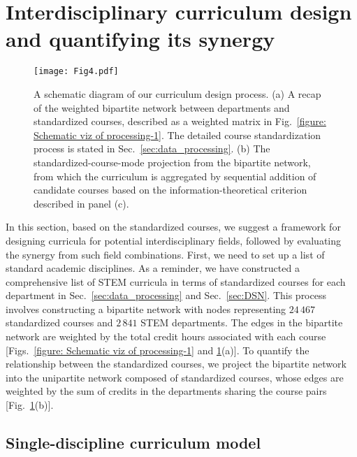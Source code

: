 \documentclass{bmcart}
\begin{document}
\section{Interdisciplinary curriculum design and quantifying its synergy}
\label{sec:curriculum_design}

\begin{figure}
\centering 
\texttt{[image: Fig4.pdf]}
\caption{A schematic diagram of our curriculum design process. 
(a) A recap of the weighted bipartite network between departments and standardized courses, described as a weighted matrix in Fig.~\ref{figure: Schematic viz of processing-1}. The detailed course standardization process is stated in Sec.~\ref{sec:data_processing}. 
(b) The standardized-course-mode projection from the bipartite network, from which the curriculum is aggregated by sequential addition of candidate courses based on the information-theoretical criterion described in panel (c). 
}
\label{figure: Schematic viz of processing}
\end{figure}

In this section, based on the standardized courses, we suggest a framework for designing curricula for potential interdisciplinary fields, followed by evaluating the synergy from such field combinations. First, we need to set up a list of standard academic disciplines.
As a reminder, we have constructed a comprehensive list of STEM curricula in terms of standardized courses for each department in Sec.~\ref{sec:data_processing} and Sec.~\ref{sec:DSN}. This process involves constructing a bipartite network with nodes representing $24\,467$ standardized courses and $2\,841$ STEM departments. The edges in the bipartite network are weighted by the total credit hours associated with each course [Figs.~\ref{figure: Schematic viz of processing-1} and \ref{figure: Schematic viz of processing}(a)]. To quantify the relationship between the standardized courses, we project the bipartite network into the unipartite network composed of standardized courses, whose edges are weighted by the sum of credits in the departments sharing the course pairs [Fig.~\ref{figure: Schematic viz of processing}(b)].

\subsection{Single-discipline curriculum model}
\label{sec:single_discipline_curriculum}
\end{document}
